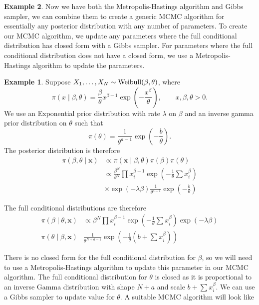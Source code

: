 \documentclass[
]{book}
\theoremstyle{definition}
\theoremstyle{definition}
\newtheorem{example}{Example}[chapter]
\theoremstyle{definition}
\theoremstyle{definition}
\theoremstyle{remark}
\begin{document}
\begin{example}
Now we have both the Metropolis-Hastings algorithm and Gibbs sampler, we can combine them to create a generic MCMC algorithm for essentially any posterior distribution with any number of parameters. To create our MCMC algorithm, we update any parameters where the full conditional distribution has closed form with a Gibbs sampler. For parameters where the full conditional distribution does not have a closed form, we use a Metropolis-Hastings algorithm to update the parameters.

\begin{example}
Suppose \(X_1, \ldots, X_N \sim \hbox{Weibull}(\beta, \theta)\), where
\[
\pi(x \mid\beta,\theta) = \frac{\beta}{\theta}x^{\beta - 1}\exp\left(-\frac{x^\beta}{\theta}\right), \qquad x, \beta, \theta > 0. 
\]
We use an Exponential prior distribution with rate \(\lambda\) on \(\beta\) and an inverse gamma prior distribution on \(\theta\) such that
\[
\pi(\theta) = \frac{1}{\theta^{a - 1}}\exp\left(-\frac{b}{\theta}\right).
\]
The posterior distribution is therefore
\begin{align*}
\pi(\beta, \theta \mid \boldsymbol{x}) &\propto \pi(\boldsymbol{x} \mid \beta, \theta)\pi(\beta)\pi(\theta) \\
&\propto \frac{\beta^N}{\theta^N}\prod x_i^{\beta - 1}\exp\left(-\frac{1}{\theta}\sum x_i^\beta\right)
\\
&\times\exp(-\lambda\beta) \frac{1}{\theta^{a - 1}}\exp\left(-\frac{b}{\theta}\right)
\end{align*}

The full conditional distributions are therefore
\begin{align*}
\pi(\beta \mid \theta, \boldsymbol{x}) &\propto\beta^N\prod x_i^{\beta - 1}\exp\left(-\frac{1}{\theta}\sum x_i^\beta\right)\exp(-\lambda\beta) \\
\pi(\theta \mid \beta, \boldsymbol{x}) & \frac{1}{\theta^{N + a -1}}\exp\left(-\frac{1}{\theta}(b + \sum x_i^\beta)\right)
\end{align*}

There is no closed form for the full conditional distribution for \(\beta\), so we will need to use a Metropolis-Hastings algorithm to update this parameter in our MCMC algorithm. The full conditional distribution for \(\theta\) is closed as it is proportional to an inverse Gamma distribution with shape \(N + a\) and scale \(b + \sum x_i^\beta\). We can use a Gibbs sampler to update value for \(\theta\). A suitable MCMC algorithm will look like


\end{example}
\end{example}
\end{document}
